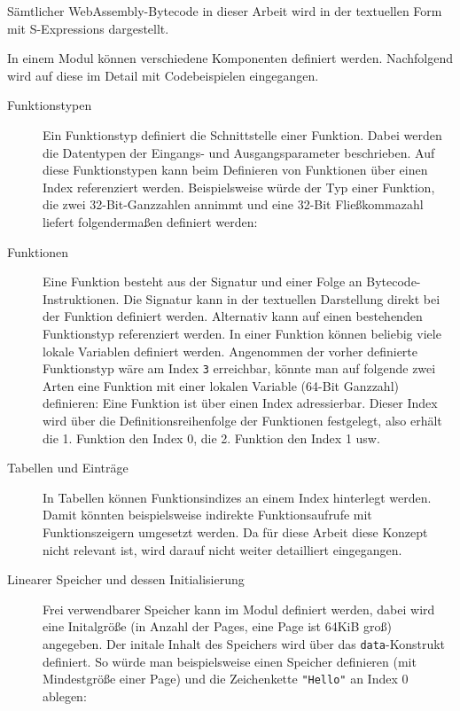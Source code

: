 

Sämtlicher WebAssembly-Bytecode in dieser Arbeit wird in der textuellen Form mit S-Expressions dargestellt.

In einem Modul können verschiedene Komponenten definiert werden. Nachfolgend wird auf diese im Detail mit Codebeispielen eingegangen.

\begin{description}
    \item[Funktionstypen] Ein Funktionstyp definiert die Schnittstelle einer Funktion. Dabei werden die Datentypen der Eingangs- und Ausgangsparameter beschrieben. Auf diese Funktionstypen kann beim Definieren von Funktionen über einen Index referenziert werden. Beispielsweise würde der Typ einer Funktion, die zwei 32-Bit-Ganzzahlen annimmt und eine 32-Bit Fließkommazahl liefert folgendermaßen definiert werden: 
    \item[Funktionen] Eine Funktion besteht aus der Signatur und einer Folge an Bytecode-Instruktionen. Die Signatur kann in der textuellen Darstellung direkt bei der Funktion definiert werden. Alternativ kann auf einen bestehenden Funktionstyp referenziert werden. In einer Funktion können beliebig viele lokale Variablen definiert werden. Angenommen der vorher definierte Funktionstyp wäre am Index \lstinline{3} erreichbar, könnte man auf folgende zwei Arten eine Funktion mit einer lokalen Variable (64-Bit Ganzzahl) definieren: 
    Eine Funktion ist über einen Index adressierbar. Dieser Index wird über die Definitionsreihenfolge der Funktionen festgelegt, also erhält die 1. Funktion den Index 0, die 2. Funktion den Index 1 usw.
    \item[Tabellen und Einträge] In Tabellen können Funktionsindizes an einem Index hinterlegt werden. Damit könnten beispielsweise indirekte Funktionsaufrufe mit Funktionszeigern umgesetzt werden. Da für diese Arbeit diese Konzept nicht relevant ist, wird darauf nicht weiter detailliert eingegangen.
    \item[Linearer Speicher und dessen Initialisierung] Frei verwendbarer Speicher kann im Modul definiert werden, dabei wird eine Initalgröße (in Anzahl der Pages, eine Page ist 64KiB groß) angegeben. Der initale Inhalt des Speichers wird über das \lstinline{data}-Konstrukt definiert. So würde man beispielsweise einen Speicher definieren (mit Mindestgröße einer Page) und die Zeichenkette \lstinline{"Hello"} an Index 0 ablegen: 

\end{description}
